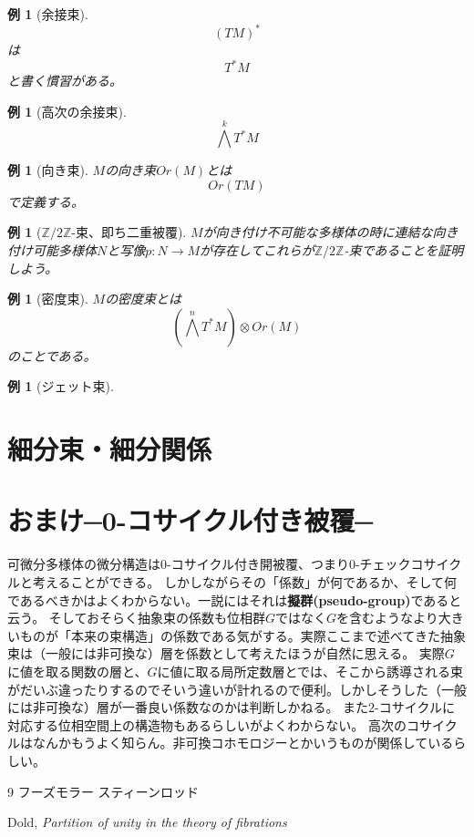 \documentclass[leqno]{jsarticle}
\newtheorem{exam}[thm]{例}
\newcommand{\zz}{\mathbb{Z}}
\begin{document}
\begin{exam}[余接束]
\[
(TM)^{*}
\]
は
\[
T^{*}M
\]
と書く慣習がある。
\end{exam}

\begin{exam}[高次の余接束]
\[
\bigwedge^kT^{*}M
\]
\end{exam}

\begin{exam}[向き束]
$M$の向き束$Or(M)$とは
\[
Or(TM)
\]
で定義する。

\end{exam}

\begin{exam}[$\zz/2\zz$-束、即ち二重被覆]
$M$が向き付け不可能な多様体の時に連結な向き付け可能多様体$N$と写像$p:N\to M$が存在してこれらが$\zz/2\zz$-束であることを証明しよう。
\end{exam}


\begin{exam}[密度束]
$M$の密度束とは
\[
\left(\bigwedge^nT^{*}M\right)\otimes Or(M)
\]
のことである。

\end{exam}

\begin{exam}[ジェット束]

\end{exam}


\section{細分束・細分関係}

\section{おまけ─0-コサイクル付き被覆─}
可微分多様体の微分構造は$0$-コサイクル付き開被覆、つまり0-チェックコサイクルと考えることができる。
しかしながらその「係数」が何であるか、そして何であるべきかはよくわからない。一説にはそれは\textbf{擬群(pseudo-group)}であると云う。
そしておそらく抽象束の係数も位相群$G$ではなく$G$を含むようなより大きいものが「本来の束構造」の係数である気がする。実際ここまで述べてきた抽象束は（一般には非可換な）層を係数として考えたほうが自然に思える。
実際$G$に値を取る関数の層と、$G$に値に取る局所定数層とでは、そこから誘導される束がだいぶ違ったりするのでそいう違いが計れるので便利。しかしそうした（一般には非可換な）層が一番良い係数なのかは判断しかねる。
また$2$-コサイクルに対応する位相空間上の構造物もあるらしいがよくわからない。
高次のコサイクルはなんかもうよく知らん。非可換コホモロジーとかいうものが関係しているらしい。
\begin{thebibliography}{9}
フーズモラー
スティーンロッド

Dold, 
\textit{Partition of unity in the theory of fibrations}
\end{thebibliography}




			
\end{document}
